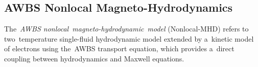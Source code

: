 
\begin{comment} %
\begin{eqnarray} 
  \E &=&  
  \frac{\nabla p_e - \vect{R}_{\Te}}{\qe \ed}
  +~~~~~~~~ 
  \frac{\vect{j}}{\sigma} 
  ~~~~~~-~~~~~~ 
  \frac{\vect{j}\vect{\times}\B}{\qe\ed c} 
  ,
  \nonumber \\
  \frac{\qe}{\me}\E 
  &=& 
  \frac{\int \vmag^2 \nabla \fzero~\dI \tilde{\vmag}}
  {\int \vmag \pdv{\fzero}{\vmag}~\dI \tilde{\vmag}}
  +  
  \frac{\int \vmag \nuei\fone~\dI \tilde{\vmag}}
  {\int \vmag \pdv{\fzero}{\vmag}~\dI \tilde{\vmag}} 
  + 
  \frac{\qe\int \vmag \fone\vect{\times}\B~\dI \tilde{\vmag}}
  {\me c \int \vmag \pdv{\fzero}{\vmag}~\dI \tilde{\vmag}} 
  .
  \nonumber
\end{eqnarray}
\end{comment} %

\subsection{AWBS Nonlocal Magneto-Hydrodynamics}
\label{sec:ANTH}
The~\textit{AWBS nonlocal~magneto-hydrodynamic~model} (Nonlocal-MHD)
refers to two~temperature single-fluid hydrodynamic model 
extended by a~kinetic model of electrons using the~AWBS transport equation,
which provides a~direct coupling between hydrodynamics and Maxwell equations.

